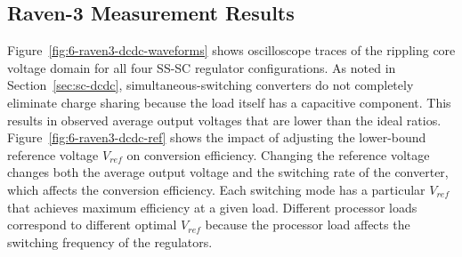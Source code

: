 \documentclass[graybox]{svmult}
\begin{document}
\subsection{Raven-3 Measurement Results}


%
%
Figure~\ref{fig:6-raven3-dcdc-waveforms} shows oscilloscope traces of the rippling core voltage domain for all four SS-SC regulator configurations.
As noted in Section~\ref{sec:sc-dcdc}, simultaneous-switching converters do not completely eliminate charge sharing because the load itself has a capacitive component.
This results in observed average output voltages that are lower than the ideal ratios.
Figure~\ref{fig:6-raven3-dcdc-ref} shows the impact of adjusting the lower-bound reference voltage $V_{ref}$ on conversion efficiency.
Changing the reference voltage changes both the average output voltage and the switching rate of the converter, which affects the conversion efficiency.
Each switching mode has a particular $V_{ref}$ that achieves maximum efficiency at a given load.
Different processor loads correspond to different optimal $V_{ref}$ because the processor load affects the switching frequency of the regulators.
\end{document}
